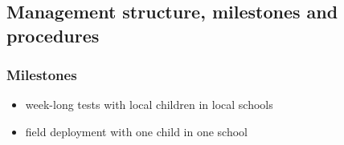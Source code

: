 \documentclass[]{article}
\begin{document}
\subsection{Management structure, milestones and procedures}\label{management-structure-milestones-and-procedures}

\subsubsection{Milestones}\label{milestones}

\begin{itemize}

\item
  week-long tests with local children in local schools
\item
  field deployment with one child in one school
\end{itemize}
\end{document}
